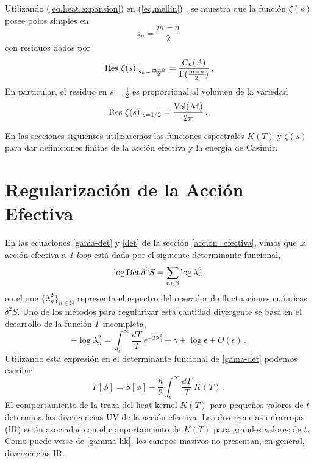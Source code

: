 Utilizando (\ref{eq.heat.expansion}) en  (\ref{eq.mellin}) , se muestra que la función $\zeta (s)$ posee polos simples en
\begin{equation}
s _n = \frac{m-n}{2} 
\label{eq.ceros.zeta}
\end{equation}
con residuos dados por
\begin{equation}
\left. {\rm Res} \ \zeta  (s)  \right| _{s_n= \frac{m - n}{2}} =  
\frac{ C_n  (A) }{ {\Gamma ( \frac{m-n}{2}} ) }
	\, ,
\label{losresi}
\end{equation}
En particular, el residuo en $s=\frac{1}{2}$ es proporcional al volumen de la variedad
\begin{equation}\label{eq.vol}
	{\rm Res} \ \zeta (s) | _{s=1/2} = \frac{ {\rm Vol (\mathcal{M})} }{2 \pi} \, .
\end{equation}


En las secciones siguientes utilizaremos las funciones espectrales $K(T)$ y $\zeta(s) $ para dar definiciones finitas de la acción efectiva y la energía de Casimir.

\section{Regularización de la Acción Efectiva}\label{cap.acc}

En las ecuaciones \ref{gama-det} y \ref{det} de la sección \ref{accion_efectiva}, vimos que la acción efectiva a {\it 1-loop} está dada por el siguiente determinante funcional,
\begin{equation}
\log {\rm Det} \, \delta ^2 S = 
\sum_{n\in{\mathbb N}} \log \lambda ^2 _n
\end{equation}
en el que $\{\lambda ^2 _n\}_{n\in\mathbb N}$ representa el espectro del operador de fluctuaciones cuánticas $\delta^2S$. Uno de los métodos para regularizar esta cantidad divergente se basa en el desarrollo de la función-$\Gamma$ incompleta,
\begin{equation}
- \log\lambda ^2 _n=\int _ { \epsilon } ^{\infty}\frac{dT}{T}\ e ^{- T \lambda ^2 _n} +\gamma+\log\epsilon + O ( \epsilon  ) \,.
\end{equation}
Utilizando esta expresión en el determinante funcional de \eqref{gama-det} podemos escribir
\begin{equation}\label{gamma-hk}
\Gamma [ \phi ] = 
S[ \phi ] - 
\frac{\hbar }{2}
\int _ { \epsilon } ^{\infty} \frac{ dT}{T}\ K(T) \, .
\end{equation}
El comportamiento de la traza del heat-kernel $K(T)$ para pequeños valores de $t$ determina las divergencias UV de la acción efectiva. Las divergencias infrarrojas (IR) están asociadas con el comportamiento de $K(T)$ para grandes valores de $t$. Como puede verse de \eqref{gamma-hk}, los campos masivos no presentan, en general, divergencias IR.

